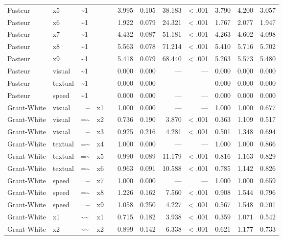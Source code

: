 \documentclass[11pt]{article}
\begin{document}
\begin{landscape}
\begin{longtable}{llllrrrrrrrr}
Pasteur & x5 & \textasciitilde{}1 &  &  & 3.995 & 0.105 & 38.183 & < .001 & 3.790 & 4.200 & 3.057 \\
Pasteur & x6 & \textasciitilde{}1 &  &  & 1.922 & 0.079 & 24.321 & < .001 & 1.767 & 2.077 & 1.947 \\
Pasteur & x7 & \textasciitilde{}1 &  &  & 4.432 & 0.087 & 51.181 & < .001 & 4.263 & 4.602 & 4.098 \\
Pasteur & x8 & \textasciitilde{}1 &  &  & 5.563 & 0.078 & 71.214 & < .001 & 5.410 & 5.716 & 5.702 \\
Pasteur & x9 & \textasciitilde{}1 &  &  & 5.418 & 0.079 & 68.440 & < .001 & 5.263 & 5.573 & 5.480 \\
Pasteur & visual & \textasciitilde{}1 &  &  & 0.000 & 0.000 & — & — & 0.000 & 0.000 & 0.000 \\
Pasteur & textual & \textasciitilde{}1 &  &  & 0.000 & 0.000 & — & — & 0.000 & 0.000 & 0.000 \\
Pasteur & speed & \textasciitilde{}1 &  &  & 0.000 & 0.000 & — & — & 0.000 & 0.000 & 0.000 \\
Grant-White & visual & =\textasciitilde{} & x1 &  & 1.000 & 0.000 & — & — & 1.000 & 1.000 & 0.677 \\
Grant-White & visual & =\textasciitilde{} & x2 &  & 0.736 & 0.190 & 3.870 & < .001 & 0.363 & 1.109 & 0.517 \\
Grant-White & visual & =\textasciitilde{} & x3 &  & 0.925 & 0.216 & 4.281 & < .001 & 0.501 & 1.348 & 0.694 \\
Grant-White & textual & =\textasciitilde{} & x4 &  & 1.000 & 0.000 & — & — & 1.000 & 1.000 & 0.866 \\
Grant-White & textual & =\textasciitilde{} & x5 &  & 0.990 & 0.089 & 11.179 & < .001 & 0.816 & 1.163 & 0.829 \\
Grant-White & textual & =\textasciitilde{} & x6 &  & 0.963 & 0.091 & 10.588 & < .001 & 0.785 & 1.142 & 0.826 \\
Grant-White & speed & =\textasciitilde{} & x7 &  & 1.000 & 0.000 & — & — & 1.000 & 1.000 & 0.659 \\
Grant-White & speed & =\textasciitilde{} & x8 &  & 1.226 & 0.162 & 7.560 & < .001 & 0.908 & 1.544 & 0.796 \\
Grant-White & speed & =\textasciitilde{} & x9 &  & 1.058 & 0.250 & 4.227 & < .001 & 0.567 & 1.548 & 0.701 \\
Grant-White & x1 & \textasciitilde{}\textasciitilde{} & x1 &  & 0.715 & 0.182 & 3.938 & < .001 & 0.359 & 1.071 & 0.542 \\
Grant-White & x2 & \textasciitilde{}\textasciitilde{} & x2 &  & 0.899 & 0.142 & 6.338 & < .001 & 0.621 & 1.177 & 0.733 \\

\end{longtable}
\end{landscape}
\end{document}
